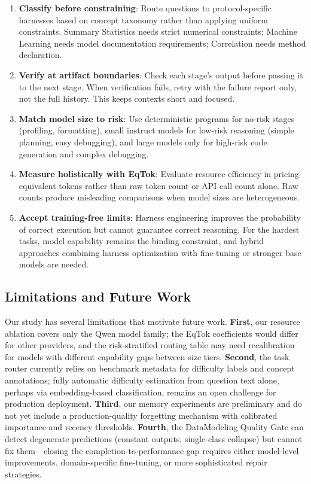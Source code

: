 \documentclass[letterpaper]{article} %
\begin{document}
\begin{enumerate}
    \item \textbf{Classify before constraining}: Route questions to protocol-specific harnesses based on concept taxonomy rather than applying uniform constraints. Summary Statistics needs strict numerical constraints; Machine Learning needs model documentation requirements; Correlation needs method declaration.
    \item \textbf{Verify at artifact boundaries}: Check each stage's output before passing it to the next stage. When verification fails, retry with the failure report only, not the full history. This keeps contexts short and focused.
    \item \textbf{Match model size to risk}: Use deterministic programs for no-risk stages (profiling, formatting), small instruct models for low-risk reasoning (simple planning, easy debugging), and large models only for high-risk code generation and complex debugging.
    \item \textbf{Measure holistically with EqTok}: Evaluate resource efficiency in pricing-equivalent tokens rather than raw token count or API call count alone. Raw counts produce misleading comparisons when model sizes are heterogeneous.
    \item \textbf{Accept training-free limits}: Harness engineering improves the probability of correct execution but cannot guarantee correct reasoning. For the hardest tasks, model capability remains the binding constraint, and hybrid approaches combining harness optimization with fine-tuning or stronger base models are needed.
\end{enumerate}

\subsection{Limitations and Future Work}

Our study has several limitations that motivate future work. \textbf{First}, our resource ablation covers only the Qwen model family; the EqTok coefficients would differ for other providers, and the risk-stratified routing table may need recalibration for models with different capability gaps between size tiers. \textbf{Second}, the task router currently relies on benchmark metadata for difficulty labels and concept annotations; fully automatic difficulty estimation from question text alone, perhaps via embedding-based classification, remains an open challenge for production deployment. \textbf{Third}, our memory experiments are preliminary and do not yet include a production-quality forgetting mechanism with calibrated importance and recency thresholds. \textbf{Fourth}, the DataModeling Quality Gate can detect degenerate predictions (constant outputs, single-class collapse) but cannot fix them---closing the completion-to-performance gap requires either model-level improvements, domain-specific fine-tuning, or more sophisticated repair strategies.
\end{document}
